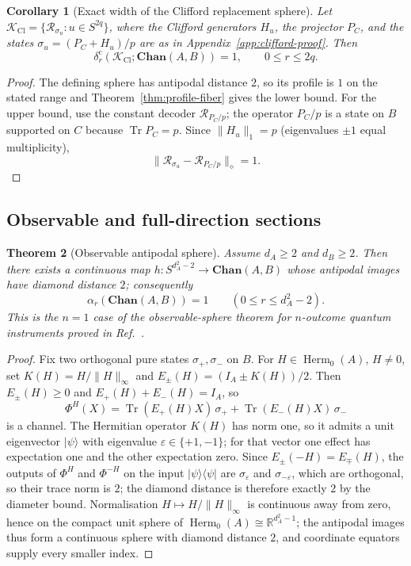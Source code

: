 \documentclass[11pt,a4paper]{article}
\theoremstyle{definition}
\theoremstyle{plain}
\newtheorem{theorem}{Theorem}[section]
\newtheorem{corollary}[theorem]{Corollary}
\theoremstyle{remark}
\DeclareMathOperator{\Tr}{Tr}
\DeclareMathOperator{\Herm}{Herm}
\newcommand{\Chan}{\mathbf{Chan}}
\begin{document}
\begin{corollary}[Exact width of the Clifford replacement sphere]
\label{cor:clifford-exact}
Let $\mathcal K_{\mathrm{Cl}}=
\{\mathcal R_{\sigma_u}:u\in S^{2q}\}$, where the Clifford generators $H_u$,
the projector $P_C$, and the states $\sigma_u=(P_C+H_u)/p$ are as in
Appendix~\ref{app:clifford-proof}. Then
\[
\delta_r^{\mathrm c}(\mathcal K_{\mathrm{Cl}};\Chan(A,B))=1,
\qquad0\leq r\leq2q.
\]
\end{corollary}

\begin{proof}
The defining sphere has antipodal distance $2$, so its profile is $1$ on
the stated range and Theorem~\ref{thm:profile-fiber} gives the lower bound.
For the upper bound, use the constant decoder $\mathcal R_{P_C/p}$; the
operator $P_C/p$ is a state on $B$ supported on $C$ because $\Tr P_C=p$. Since
$\|H_u\|_1=p$ (eigenvalues $\pm1$ equal multiplicity),
\[
\|\mathcal R_{\sigma_u}-\mathcal R_{P_C/p}\|_\diamond=1.
\]
\end{proof}

\subsection{Observable and full-direction sections}

\begin{theorem}[Observable antipodal sphere]
\label{thm:observable-channel}
Assume $d_A\ge2$ and $d_B\ge2$. Then there exists a continuous map
$h:S^{d_A^2-2}\to\Chan(A,B)$ whose antipodal images have diamond distance
$2$; consequently
\[
\alpha_r(\Chan(A,B))=1\qquad(0\le r\le d_A^2-2).
\]
This is the $n=1$ case of the observable-sphere theorem for $n$-outcome
quantum instruments proved in Ref.~\cite{CompanionInstruments}.
\end{theorem}

\begin{proof}
Fix two orthogonal pure states $\sigma_+,\sigma_-$ on $B$. For
$H\in\Herm_0(A)$, $H\neq0$, set $K(H)=H/\|H\|_\infty$ and
$E_\pm(H)=(I_A\pm K(H))/2$. Then $E_\pm(H)\ge0$ and
$E_+(H)+E_-(H)=I_A$, so
\[
\Phi^H(X)=\Tr(E_+(H)X)\,\sigma_++\Tr(E_-(H)X)\,\sigma_-
\]
is a channel. The Hermitian operator $K(H)$ has norm one, so it admits a unit
eigenvector $|\psi\rangle$ with eigenvalue $\varepsilon\in\{+1,-1\}$; for
that vector one effect has expectation one and the other expectation
zero. Since
$E_\pm(-H)=E_\mp(H)$, the outputs of $\Phi^H$ and $\Phi^{-H}$ on the input
$|\psi\rangle\langle\psi|$ are $\sigma_\varepsilon$ and
$\sigma_{-\varepsilon}$, which are orthogonal, so their trace norm is
$2$; the diamond distance is therefore exactly $2$ by the diameter bound.
Normalisation $H\mapsto H/\|H\|_\infty$ is continuous away from zero,
hence on the compact unit sphere of $\Herm_0(A)\cong\mathbb R^{d_A^2-1}$;
the antipodal images thus form a continuous sphere with diamond distance
$2$, and coordinate equators supply every smaller index.
\end{proof}
\end{document}

